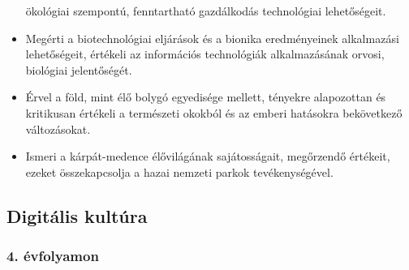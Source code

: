 \begin{itemize}
  ökológiai szempontú, fenntartható gazdálkodás technológiai
  lehetőségeit.
\item
  Megérti a biotechnológiai eljárások és a bionika eredményeinek
  alkalmazási lehetőségeit, értékeli az információs technológiák
  alkalmazásának orvosi, biológiai jelentőségét.
\item
  Érvel a föld, mint élő bolygó egyedisége mellett, tényekre alapozottan
  és kritikusan értékeli a természeti okokból és az emberi hatásokra
  bekövetkező változásokat.
\item
  Ismeri a kárpát-medence élővilágának sajátosságait, megőrzendő
  értékeit, ezeket összekapcsolja a hazai nemzeti parkok
  tevékenységével.
\end{itemize}

\hypertarget{digitalis-kultura}{%
\subsection{Digitális kultúra}\label{digitalis-kultura}}

\hypertarget{evfolyamon-3}{%
\subsubsection{4. évfolyamon}\label{evfolyamon-3}}

